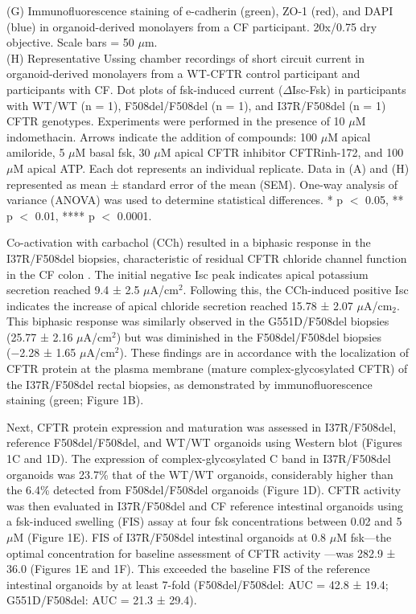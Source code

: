 {(G) Immunofluorescence staining of e-cadherin (green), ZO-1 (red), and DAPI (blue) in organoid-derived monolayers from a CF participant. 20x/0.75 dry objective. Scale bars = 50 $\mu$m.\\

(H) Representative Ussing chamber recordings of short circuit current in organoid-derived monolayers from a WT-CFTR control participant and participants with CF. Dot plots of fsk-induced current ($\Delta$Isc-Fsk) in participants with WT/WT (n = 1), F508del/F508del (n = 1), and I37R/F508del (n = 1) CFTR genotypes. Experiments were performed in the presence of 10 $\mu$M indomethacin. Arrows indicate the addition of compounds: 100 $\mu$M apical amiloride, 5 $\mu$M basal fsk, 30 $\mu$M apical CFTR inhibitor CFTRinh-172, and 100 $\mu$M apical ATP. Each dot represents an individual replicate. Data in (A) and (H) represented as mean ± standard error of the mean (SEM). One-way analysis of variance (ANOVA) was used to determine statistical differences. * p $<$ 0.05, ** p $<$ 0.01, **** p $<$ 0.0001.\\}

\smallskip

Co-activation with carbachol (CCh) resulted in a biphasic response in the I37R/F508del biopsies, characteristic of residual CFTR chloride channel function in the CF colon \cite{graeber2015,veeze1994}. The initial negative Isc peak indicates apical potassium secretion reached 9.4 ± 2.5 $\mu$A/cm$^2$. Following this, the CCh-induced positive Isc indicates the increase of apical chloride secretion reached 15.78 ± 2.07 $\mu$A/cm$_2$. This biphasic response was similarly observed in the G551D/F508del biopsies (25.77 ± 2.16 $\mu$A/cm$^2$) but was diminished in the F508del/F508del biopsies (−2.28 ± 1.65 $\mu$A/cm$^2$). These findings are in accordance with the localization of CFTR protein at the plasma membrane (mature complex-glycosylated CFTR) of the I37R/F508del rectal biopsies, as demonstrated by immunofluorescence staining (green; Figure 1B). \newline

Next, CFTR protein expression and maturation was assessed in I37R/F508del, reference F508del/F508del, and WT/WT organoids using Western blot (Figures 1C and 1D). The expression of complex-glycosylated C band in I37R/F508del organoids was 23.7\% that of the WT/WT organoids, considerably higher than the 6.4\% detected from F508del/F508del organoids (Figure 1D). CFTR activity was then evaluated in I37R/F508del and CF reference intestinal organoids using a fsk-induced swelling (FIS) assay at four fsk concentrations between 0.02 and 5 $\mu$M (Figure 1E). FIS of I37R/F508del intestinal organoids at 0.8 $\mu$M fsk—the optimal concentration for baseline assessment of CFTR activity \cite{dekkers2016}—was 282.9 ± 36.0 (Figures 1E and 1F). This exceeded the baseline FIS of the reference intestinal organoids by at least 7-fold (F508del/F508del: AUC = 42.8 ± 19.4; G551D/F508del: AUC = 21.3 ± 29.4).


